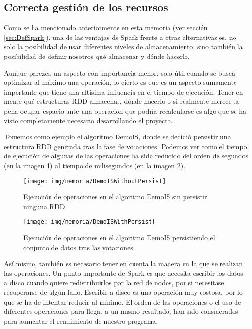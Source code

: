 \subsection{Correcta gestión de los recursos}

Como se ha mencionado anteriormente en esta memoria (ver sección \ref{sec:DefSpark}), una de las ventajas de Spark frente a otras alternativas es, no solo la posibilidad de usar diferentes niveles de almacenamiento, sino también la posibilidad de definir nosotros qué almacenar y dónde hacerlo.

Aunque parezca un aspecto con importancia menor, solo útil cuando se busca optimizar al máximo una operación, lo cierto es que es un aspecto sumamente importante que tiene una altísima influencia en el tiempo de ejecución. Tener en mente qué estructuras RDD almacenar, dónde hacerlo o si realmente merece la pena ocupar espacio ante una operación que podría recalcularse es algo que se ha visto completamente necesario desarrollando el proyecto.

Tomemos como ejemplo el algoritmo DemoIS, donde se decidió persistir una estructura RDD generada tras la fase de votaciones. Podemos ver como el tiempo de ejecución de algunas de las operaciones ha sido reducido del orden de segundos (en la imagen \ref{fig:img/memoria/DemoISWithoutPersist}) al tiempo de milisegundos (en la imagen \ref{fig:img/memoria/DemoISWithPersist}).

	\begin{figure}[!h]
		\centering
		\texttt{[image: img/memoria/DemoISWithoutPersist]}
		\caption{Ejecución de operaciones en el algoritmo DemoIS sin persistir ninguna RDD.}\label{fig:img/memoria/DemoISWithoutPersist}
	\end{figure}
	\FloatBarrier
	
		\begin{figure}[!h]
		\centering
		\texttt{[image: img/memoria/DemoISWithPersist]}
		\caption{Ejecución de operaciones en el algoritmo DemoIS persistiendo el conjunto de datos tras las votaciones.}\label{fig:img/memoria/DemoISWithPersist}
	\end{figure}
	\FloatBarrier


Así mismo, también es necesario tener en cuenta la manera en la que se realizan las operaciones. Un punto importante de Spark es que necesita escribir los datos a disco cuando quiere redistribuirlos por la red de nodos, por si necesitase recuperarse de algún fallo. Escribir a disco es una operación muy costosa, por lo que se ha de intentar reducir al mínimo. El orden de las operaciones o el uso de diferentes operaciones para llegar a un mismo resultado, han sido considerados para aumentar el rendimiento de nuestro programa.

